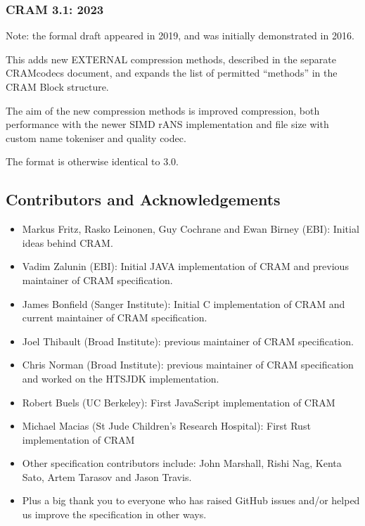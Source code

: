 \documentclass[a4paper]{article}
\begin{document}
\subsubsection*{CRAM 3.1: 2023}

Note: the formal draft appeared in 2019, and was initially
demonstrated in 2016.

This adds new EXTERNAL compression methods, described in the separate
CRAMcodecs document, and expands the list of permitted ``methods'' in
the CRAM Block structure.

The aim of the new compression methods is improved compression, both
performance with the newer SIMD rANS implementation and file size with
custom name tokeniser and quality codec.

The format is otherwise identical to 3.0.

\newpage

\subsection{\textbf{Contributors and Acknowledgements}}

\begin{itemize}
\item
Markus Fritz, Rasko Leinonen, Guy Cochrane and Ewan Birney (EBI):
Initial ideas behind CRAM.

\item Vadim Zalunin (EBI):
Initial JAVA implementation of CRAM and previous maintainer of CRAM specification.

\item James Bonfield (Sanger Institute):
Initial C implementation of CRAM and current maintainer of CRAM
specification.

\item Joel Thibault (Broad Institute):
previous maintainer of CRAM specification.

\item Chris Norman (Broad Institute):
previous maintainer of CRAM specification and worked on
the HTSJDK implementation.

\item Robert Buels (UC Berkeley): First JavaScript implementation of CRAM

\item Michael Macias (St Jude Children's Research Hospital): First Rust implementation of CRAM

\item Other specification contributors include: John Marshall, Rishi Nag,
Kenta Sato, Artem Tarasov and Jason Travis.

\item Plus a big thank you to everyone who has raised GitHub issues
and/or helped us improve the specification in other ways.
\end{itemize}
\end{document}
